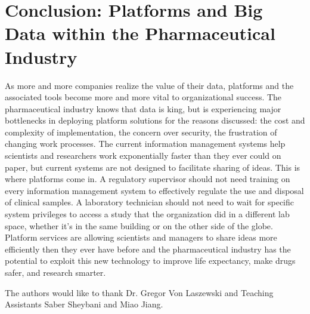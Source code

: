 \documentclass[sigconf]{acmart}
\begin{document}
\section{Conclusion: Platforms and Big Data within the Pharmaceutical Industry}
As more and more companies realize the value of their data, platforms and the associated tools become more and more vital to organizational success. The pharmaceutical industry knows that data is king, but is experiencing major bottlenecks in deploying platform solutions for the reasons discussed: the cost and complexity of implementation, the concern over security, the frustration of changing work processes. The current information management systems help scientists and researchers work exponentially faster than they ever could on paper, but current systems are not designed to facilitate sharing of ideas. This is where platforms come in. A regulatory supervisor should not need training on every information management system to effectively regulate the use and disposal of clinical samples. A laboratory technician should not need to wait for specific system privileges to access a study that the organization did in a different lab space, whether it's in the same building or on the other side of the globe. Platform services are allowing scientists and managers to share ideas more efficiently then they ever have before and the pharmaceutical industry has the potential to exploit this new technology to improve life expectancy, make drugs safer, and research smarter. 


\begin{acks}

  The authors would like to thank Dr. Gregor Von Laszewski  and Teaching Assistants Saber Sheybani and Miao Jiang.

\end{acks}


 
\end{document}
